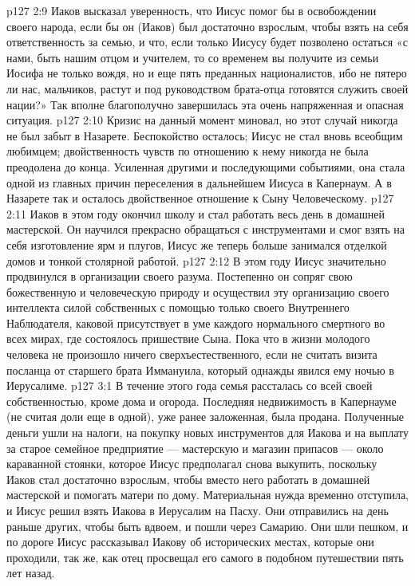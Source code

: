 \vs p127 2:9 Иаков высказал уверенность, что Иисус помог бы в освобождении своего народа, если бы он (Иаков) был достаточно взрослым, чтобы взять на себя ответственность за семью, и что, если только Иисусу будет позволено остаться «с нами, быть нашим отцом и учителем, то со временем вы получите из семьи Иосифа не только вождя, но и еще пять преданных националистов, ибо не пятеро ли нас, мальчиков, растут и под руководством брата\hyp{}отца готовятся служить своей нации?» Так вполне благополучно завершилась эта очень напряженная и опасная ситуация.
\vs p127 2:10 Кризис на данный момент миновал, но этот случай никогда не был забыт в Назарете. Беспокойство осталось; Иисус не стал вновь всеобщим любимцем; двойственность чувств по отношению к нему никогда не была преодолена до конца. Усиленная другими и последующими событиями, она стала одной из главных причин переселения в дальнейшем Иисуса в Капернаум. А в Назарете так и осталось двойственное отношение к Сыну Человеческому.
\vs p127 2:11 \pc Иаков в этом году окончил школу и стал работать весь день в домашней мастерской. Он научился прекрасно обращаться с инструментами и смог взять на себя изготовление ярм и плугов, Иисус же теперь больше занимался отделкой домов и тонкой столярной работой.
\vs p127 2:12 \pc В этом году Иисус значительно продвинулся в организации своего разума. Постепенно он сопряг свою божественную и человеческую природу и осуществил эту организацию своего интеллекта силой собственных  с помощью только своего Внутреннего Наблюдателя, каковой присутствует в уме каждого нормального смертного во всех мирах, где состоялось пришествие Сына. Пока что в жизни молодого человека не произошло ничего сверхъестественного, если не считать визита посланца от старшего брата Иммануила, который однажды явился ему ночью в Иерусалиме.
\vs p127 3:1 В течение этого года семья рассталась со всей своей собственностью, кроме дома и огорода. Последняя недвижимость в Капернауме (не считая доли еще в одной), уже ранее заложенная, была продана. Полученные деньги ушли на налоги, на покупку новых инструментов для Иакова и на выплату за старое семейное предприятие --- мастерскую и магазин припасов --- около караванной стоянки, которое Иисус предполагал снова выкупить, поскольку Иаков стал достаточно взрослым, чтобы вместо него работать в домашней мастерской и помогать матери по дому. Материальная нужда временно отступила, и Иисус решил взять Иакова в Иерусалим на Пасху. Они отправились на день раньше других, чтобы быть вдвоем, и пошли через Самарию. Они шли пешком, и по дороге Иисус рассказывал Иакову об исторических местах, которые они проходили, так же, как отец просвещал его самого в подобном путешествии пять лет назад.
